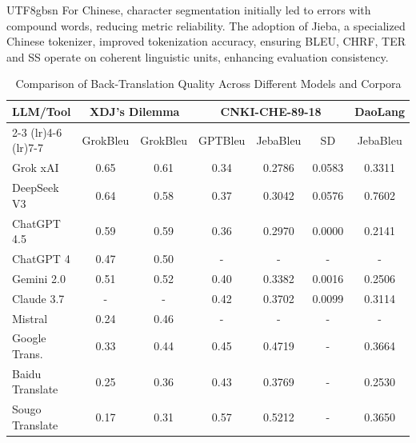 \documentclass[conference]{IEEEtran}
\begin{document}
\begin{CJK}{UTF8}{gbsn}
For Chinese, character segmentation initially led to errors with compound words, reducing metric reliability. The adoption of Jieba, a specialized Chinese tokenizer, improved tokenization accuracy, ensuring BLEU, CHRF, TER and SS operate on coherent linguistic units, enhancing evaluation consistency.

    

 


\begin{table}[htbp]
\centering
\caption{Comparison of Back-Translation Quality Across Different Models and Corpora}
\begin{tabular}{lcccccc}
\toprule
\multirow{2}{}{LLM/Tool} & \multicolumn{2}{c}{XDJ's Dilemma} & \multicolumn{3}{c}{CNKI-CHE-89-18} & DaoLang \\
\cmidrule(lr){2-3} \cmidrule(lr){4-6} \cmidrule(lr){7-7}
 & GrokBleu & GrokBleu & GPTBleu & JebaBleu & SD & JebaBleu \\
\midrule
Grok xAI & 0.65 & 0.61 & 0.34 & 0.2786 & 0.0583 & 0.3311 \\
DeepSeek V3 & 0.64 & 0.58 & 0.37 & 0.3042 & 0.0576 & 0.7602 \\
ChatGPT 4.5 & 0.59 & 0.59 & 0.36 & 0.2970 & 0.0000 & 0.2141 \\
ChatGPT 4 & 0.47 & 0.50 & - & - & - & - \\
Gemini 2.0 & 0.51 & 0.52 & 0.40 & 0.3382 & 0.0016 & 0.2506 \\
Claude 3.7 & - & - & 0.42 & 0.3702 & 0.0099 & 0.3114 \\
Mistral & 0.24 & 0.46 & - & - & - & - \\
Google Trans. & 0.33 & 0.44 & 0.45 & 0.4719 & - & 0.3664 \\
Baidu Translate & 0.25 & 0.36 & 0.43 & 0.3769 & - & 0.2530 \\
Sougo Translate & 0.17 & 0.31 & 0.57 & 0.5212 & - & 0.3650 \\
\bottomrule
\end{tabular}
\label{tab:backtranslation-bleu}
\end{table}


\end{CJK}
\end{document}
